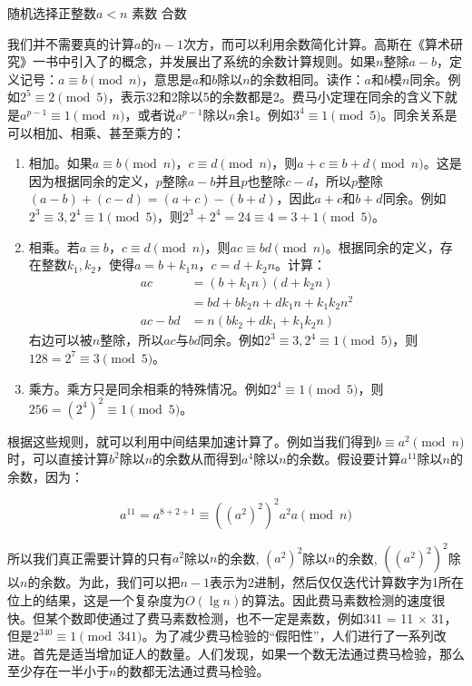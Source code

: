 \documentclass[b5paper]{ctexart}
\begin{document}
\begin{algorithmic}
  \State 随机选择正整数$a < n$
    \State \Return 素数
  \Else
    \State \Return 合数
  \EndIf
\EndFunction
\end{algorithmic}

我们并不需要真的计算$a$的$n-1$次方，而可以利用余数简化计算。高斯在《算术研究》一书中引入了的概念，并发展出了系统的余数计算规则。如果$n$整除$a - b$，定义记号：$a \equiv b \pmod{n}$，意思是$a$和$b$除以$n$的余数相同。读作：$a$和$b$模$n$同余。例如$2^5 \equiv 2 \pmod{5}$，表示32和2除以5的余数都是2。费马小定理在同余的含义下就是$a^{p-1} \equiv 1 \pmod{n}$，或者说$a^{p-1}$除以$n$余1。例如$3^4 \equiv 1 \pmod{5}$。同余关系是可以相加、相乘、甚至乘方的：

\begin{enumerate}[(1)]
\item 相加。如果$a \equiv b \pmod{n}$，$c \equiv d \pmod{n}$，则$a + c \equiv b + d \pmod{n}$。这是因为根据同余的定义，$p$整除$a - b$并且$p$也整除$c - d$，所以$p$整除$(a - b) + (c - d) = (a + c) - (b + d)$，因此$a + c$和$b + d$同余。例如$2^3 \equiv 3, 2^4 \equiv 1 \pmod{5}$，则$2^3 + 2^4 = 24 \equiv 4 = 3 + 1 \pmod{5}$。

\item 相乘。若$a \equiv b，c \equiv d \pmod{n}$，则$ac \equiv bd \pmod{n}$。根据同余的定义，存在整数$k_1, k_2$，使得$a = b + k_1n$，$c = d + k_2n$。计算：
  \begin{align*}
    ac &= (b + k_1n)(d + k_2n) \\
       &= bd + bk_2n + dk_1n + k_1k_2n^2 \\
    ac - bd &= n(bk_2 + dk_1 + k_1k_2n)
  \end{align*}
右边可以被$n$整除，所以$ac$与$bd$同余。例如$2^3 \equiv 3, 2^4 \equiv 1 \pmod{5}$，则$128 = 2^7 \equiv 3 \pmod{5}$。

\item 乘方。乘方只是同余相乘的特殊情况。例如$2^4 \equiv 1 \pmod{5}$，则$256 = (2^4)^2 \equiv 1 \pmod{5}$。
\end{enumerate}

根据这些规则，就可以利用中间结果加速计算了。例如当我们得到$b \equiv a^2 \pmod{n}$时，可以直接计算$b^2$除以$n$的余数从而得到$a^4$除以$n$的余数。假设要计算$a^{11}$除以$n$的余数，因为：

\[
a^{11} = a^{8 + 2 + 1} \equiv ((a^2)^2)^2a^2a \pmod{n}
\]

所以我们真正需要计算的只有$a^2$除以$n$的余数, $(a^2)^2$除以$n$的余数, $((a^2)^2)^2$除以$n$的余数。为此，我们可以把$n-1$表示为2进制，然后仅仅迭代计算数字为1所在位上的结果，这是一个复杂度为$O(\lg n)$的算法。因此费马素数检测的速度很快。但某个数即使通过了费马素数检测，也不一定是素数，例如341 = 11 $\times$ 31，但是$2^{340} \equiv 1 \pmod{341}$。为了减少费马检验的“假阳性”，人们进行了一系列改进。首先是适当增加证人的数量。人们发现，如果一个数无法通过费马检验，那么至少存在一半小于$n$的数都无法通过费马检验。
\end{document}
